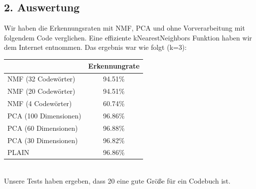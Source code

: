 \documentclass{article}
\begin{document}
\subsection*{2. Auswertung}
Wir haben die Erkennungsraten mit NMF, PCA und ohne Vorverarbeitung
mit folgendem Code verglichen. Eine effiziente kNearestNeighbors
Funktion haben wir dem Internet entnommen. Das ergebnis war wie folgt (k=3):\\
\begin{tabular}{ l |c }
  & Erkennungrate\\
  \hline
  NMF (32 Codewörter) & 94.51\% \\
  NMF (20 Codewörter) & 94.51\% \\
  NMF (4 Codewörter) & 60.74\% \\
  PCA (100 Dimensionen) & 96.86\% \\
  PCA (60 Dimensionen) & 96.88\% \\
  PCA (30 Dimensionen) & 96.82\% \\
  PLAIN & 96.86\% \\
  \hline
\end{tabular}\\
Unsere Tests haben ergeben, dass 20 eine gute Größe für ein Codebuch ist.
\end{document}
